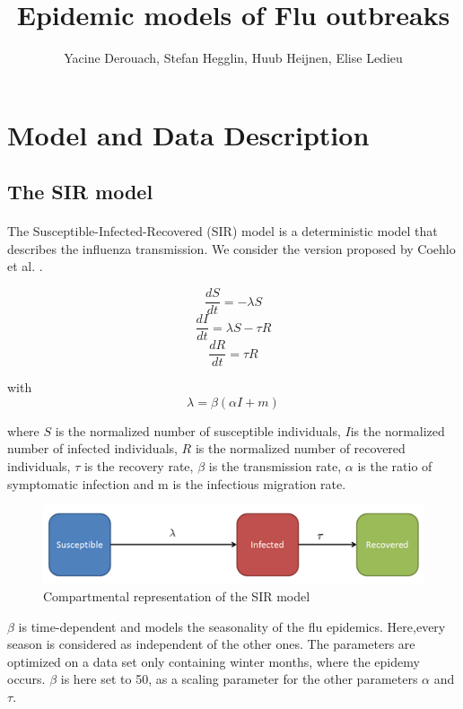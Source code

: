 \documentclass[11pt, a4paper]{article}
\author{Yacine Derouach, Stefan Hegglin, Huub Heijnen, Elise Ledieu}
\title{Epidemic models of Flu outbreaks}
\begin{document}
\maketitle

\section{Model and Data Description}
\subsection{The SIR model}
\label{sec:SIR}
\paragraph{}
The Susceptible-Infected-Recovered (SIR) model is a deterministic model that describes the influenza transmission. We consider the version proposed by Coehlo et al. \cite{coelho2011bayesian}.

\begin{equation}
\frac{dS}{dt} = - \lambda S
\end{equation}
\begin{equation}
\frac{dI}{dt} = \lambda S - \tau R
\end{equation}
\begin{equation}
\frac{dR}{dt} = \tau R
\end{equation}

with \[ \lambda = \beta (\alpha I + m) \]

where $S$ is the normalized number of susceptible individuals, $I$is the normalized number of infected individuals, $R$ is the normalized number of recovered individuals, $\tau $ is the recovery rate, $\beta $ is the transmission rate, $\alpha$ is the ratio of symptomatic infection and m is the infectious migration rate.

\begin{figure}[h]
\center
   \includegraphics[width = \textwidth]{picture1.png}
   \caption{Compartmental representation of the SIR model}
   \label{SIRcr}
\end{figure}

$\beta$ is time-dependent and models the seasonality of the flu epidemics. Here,every season is considered as independent of the other ones. The parameters are optimized on a data set only containing winter months, where the epidemy occurs. $\beta$ is here set to 50, as a scaling parameter for the other parameters $\alpha$ and $\tau$.
\end{document}
